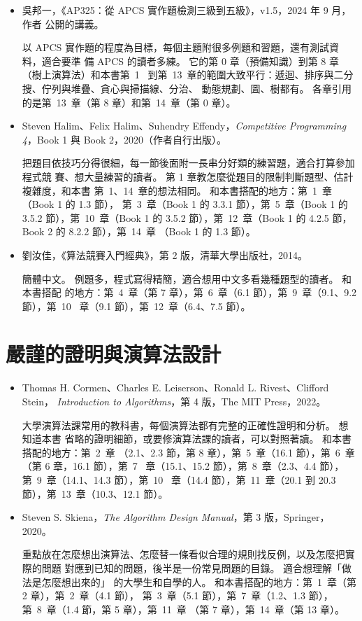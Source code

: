 \begin{itemize}
\item 吳邦一，《AP325：從 APCS 實作題檢測三級到五級》，v1.5，2024 年 9 月，作者
公開的講義。

以 APCS 實作題的程度為目標，每個主題附很多例題和習題，還有測試資料，適合要準
備 APCS 的讀者多練。 它的第 0 章（預備知識）到第 8 章（樹上演算法）和本書第~1~%
到第~13~章的範圍大致平行：遞迴、排序與二分搜、佇列與堆疊、貪心與掃描線、分治、
動態規劃、圖、樹都有。 各章引用的是第~13~章（第 8 章）和第~14~章（第 0 章）。

\item Steven Halim、Felix Halim、Suhendry Effendy，\textit{Competitive
Programming 4}，Book 1 與 Book 2，2020（作者自行出版）。

把題目依技巧分得很細，每一節後面附一長串分好類的練習題，適合打算參加程式競
賽、想大量練習的讀者。 第 1 章教怎麼從題目的限制判斷題型、估計複雜度，和本書
第~1、14~章的想法相同。 和本書搭配的地方：第~1~章（Book 1 的 1.3 節），
第~3~章（Book 1 的 3.3.1 節），第~5~章（Book 1 的 3.5.2 節），第~10~章（Book 1
的 3.5.2 節），第~12~章（Book 1 的 4.2.5 節，Book 2 的 8.2.2 節），第~14~章
（Book 1 的 1.3 節）。

\item 劉汝佳，《算法競賽入門經典》，第 2 版，清華大學出版社，2014。

簡體中文。 例題多，程式寫得精簡，適合想用中文多看幾種題型的讀者。 和本書搭配
的地方：第~4~章（第 7 章），第~6~章（6.1 節），第~9~章（9.1、9.2 節），第~10~%
章（9.1 節），第~12~章（6.4、7.5 節）。
\end{itemize}

\section*{嚴謹的證明與演算法設計}

\begin{itemize}
\item Thomas H. Cormen、Charles E. Leiserson、Ronald L. Rivest、Clifford Stein，
\textit{Introduction to Algorithms}，第 4 版，The MIT Press，2022。

大學演算法課常用的教科書，每個演算法都有完整的正確性證明和分析。 想知道本書
省略的證明細節，或要修演算法課的讀者，可以對照著讀。 和本書搭配的地方：第~2~章
（2.1、2.3 節，第 8 章），第~5~章（16.1 節），第~6~章（第 6 章，16.1 節），第~7~%
章（15.1、15.2 節），第~8~章（2.3、4.4 節），第~9~章（14.1、14.3 節），第~10~%
章（14.4 節），第~11~章（20.1 到 20.3 節），第~13~章（10.3、12.1 節）。

\item Steven S. Skiena，\textit{The Algorithm Design Manual}，第 3 版，Springer，
2020。

重點放在怎麼想出演算法、怎麼替一條看似合理的規則找反例，以及怎麼把實際的問題
對應到已知的問題，後半是一份常見問題的目錄。 適合想理解「做法是怎麼想出來的」
的大學生和自學的人。 和本書搭配的地方：第~1~章（第 2 章），第~2~章（4.1 節），
第~3~章（5.1 節），第~7~章（1.2、1.3 節），第~8~章（1.4 節，第 5 章），第~11~章
（第 7 章），第~14~章（第 13 章）。
\end{itemize}

